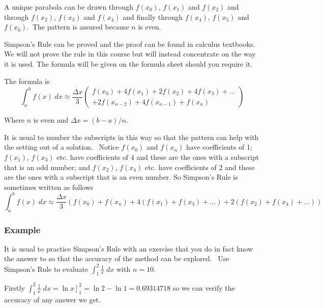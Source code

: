 A unique parabola can be drawn through $f (x_{0})$, $f (x_{1})$ and $f (x_{2})$ and through $f (x_{2})$, $f (x_{3})$ and $f (x_{4})$ and finally through $f (x_{4})$, $f (x_{5})$ and $f (x_{6})$.\ The pattern is assured because $n$ is even. 

Simpson's Rule can be proved and the proof can be found in calculus textbooks. We
will not prove the rule in this course but will instead concentrate on the way it is used. The formula will
be given on the formula sheet should you require it. 

The formula is
\begin{equation}\int _{a}^{b}f (x)\; d x \approx \frac{ \Delta x}{3} \left (\begin{array}{c}f (x_{0}) +4 f (x_{1}) +2 f (x_{2}) +4 f (x_{3}) +\ldots  \\
 +2 f (x_{n -2}) +4 f (x_{n -1}) +f (x_{n})\end{array}\right )\tag{1}
\end{equation}

Where $n$ is even and $ \Delta x =\left (b -a\right )/n$. 

It is usual to number the subscripts in this way so that the pattern can help with the setting out of a solution.
\ Notice $f (x_{0})$ and $f (x_{n})$ have coefficients of 1; $f (x_{1})$, $f (x_{3})$ etc. have coefficients of $4$ and these are the ones with a subscript that is an odd number; and $f (x_{2})$, $f (x_{4})$ etc. have coefficients of $2$ and these are the ones with a subscript that is an even number. So Simpson's Rule is sometimes written as follows
\begin{equation}\int _{a}^{b}f (x)\; d x \approx \frac{ \Delta x}{3} \left (f (x_{0}) +f (x_{n}) +4 \left (f (x_{1}) +f (x_{3}) +\ldots \right ) +2 \left (f (x_{2}) +f (x_{4}) +\ldots \right )\right )\tag{2}
\end{equation}

\subsubsection{Example}
It is usual to practice Simpson's Rule with an exercise that you do in fact know the answer to so that the accuracy of the method can be explored.
\ Use Simpson's Rule to evaluate $\int _{1}^{2}\frac{1}{x}\; d x$ with $n =10$. 

Firstly $\int _{1}^{2}\frac{1}{x}\; d x =\left .\ln  x\right ]_{1}^{2} =\ln  2 -\ln  1 =0.69314718$ so we can verify the accuracy of any answer we get. 

